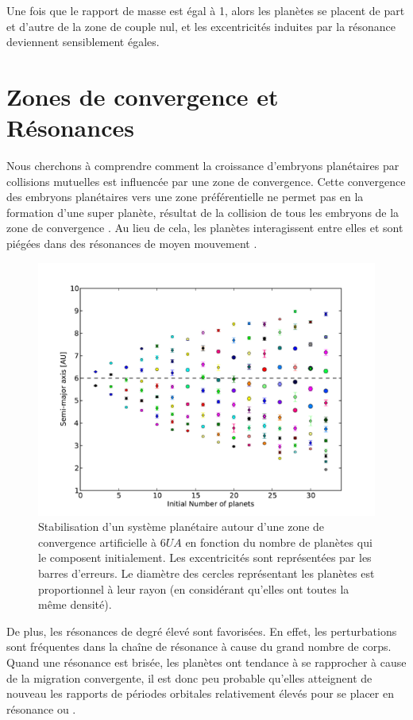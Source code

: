 \bigskip

Une fois que le rapport de masse est égal à 1, alors les planètes se placent de part et d'autre de la zone de couple nul, et
les excentricités induites par la résonance deviennent sensiblement égales.

\section{Zones de convergence et Résonances}
Nous cherchons à comprendre comment la croissance d'embryons planétaires par collisions mutuelles est influencée par une zone de convergence. Cette convergence des embryons
planétaires vers une zone préférentielle ne permet pas en la formation d'une super planète, résultat de la collision de tous les
embryons de la zone de convergence \citep{morbidelli2008building, sandor2011formation}. Au lieu de cela, les planètes
interagissent entre elles et sont piégées dans des résonances de moyen mouvement . 

\begin{figure}[htbp]
\centering
\includegraphics[width=0.75\linewidth]{figure/MMR_number.pdf}
\caption[Équilibre d'un système à mesure que le nombre de planètes initial augmente.]{Stabilisation d'un système planétaire
autour d'une zone de convergence artificielle à $6\unit{UA}$ en fonction du
nombre de planètes qui le composent initialement. Les excentricités sont représentées par les barres d'erreurs. Le diamètre des cercles représentant les planètes est proportionnel à leur rayon (en considérant qu'elles ont toutes la même
densité).}\label{fig:MMR_number}
\end{figure}

De plus, les résonances de degré élevé sont favorisées. En effet, les perturbations sont fréquentes dans la chaîne de résonance à cause du grand nombre de corps. Quand une résonance est brisée, les planètes ont tendance à se rapprocher à cause de la migration convergente, il est donc peu probable qu'elles atteignent de nouveau les rapports de périodes orbitales relativement élevés pour se placer en résonance  ou . 


